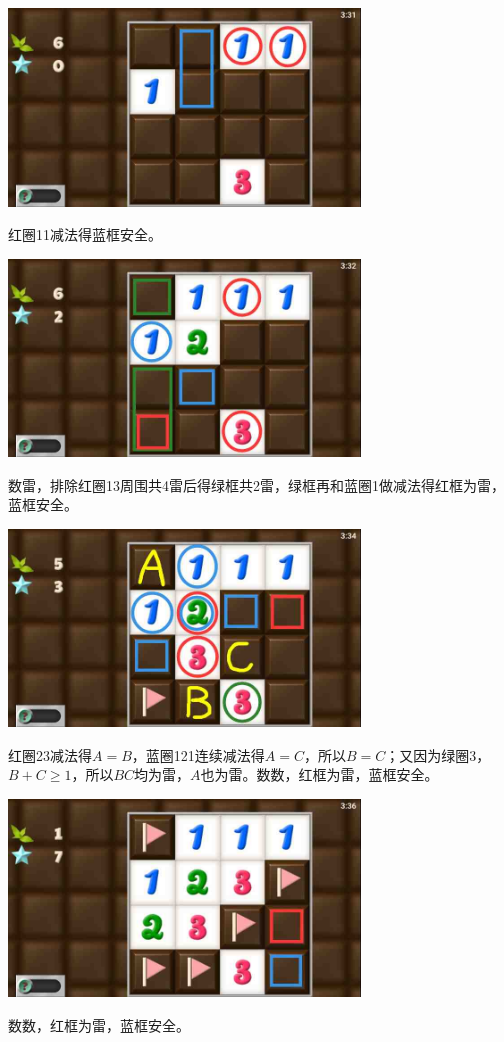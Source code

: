 \subsection{} %
\begin{center}
    \includegraphics[width=0.7\textwidth]{puzzlelow/159-1.jpg}
\end{center}
红圈11减法得蓝框安全。
\begin{center}
    \includegraphics[width=0.7\textwidth]{puzzlelow/159-2.jpg}
\end{center}
数雷，排除红圈13周围共4雷后得绿框共2雷，绿框再和蓝圈1做减法得红框为雷，蓝框安全。
\begin{center}
    \includegraphics[width=0.7\textwidth]{puzzlelow/159-3.jpg}
\end{center}
红圈23减法得$A=B$，蓝圈121连续减法得$A=C$，所以$B=C$；又因为绿圈3，$B+C\ge 1$，所以$BC$均为雷，$A$也为雷。数数，红框为雷，蓝框安全。
\begin{center}
    \includegraphics[width=0.7\textwidth]{puzzlelow/159-4.jpg}
\end{center}
数数，红框为雷，蓝框安全。

